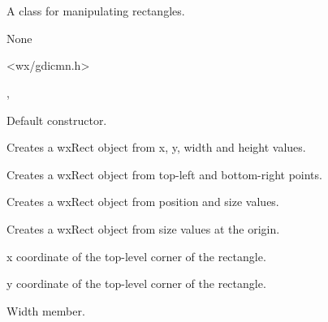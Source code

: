 \section{}\label{wxrect}

A class for manipulating rectangles.


None


<wx/gdicmn.h>


, 


\label{wxrectctor}


Default constructor.


Creates a wxRect object from x, y, width and height values.


Creates a wxRect object from top-left and bottom-right points.


Creates a wxRect object from position and size values.


Creates a wxRect object from size values at the origin.

\label{wxrectx}


x coordinate of the top-level corner of the rectangle.

\label{wxrecty}


y coordinate of the top-level corner of the rectangle.

\label{wxrectwidth}


Width member.

\label{wxrectheight}

